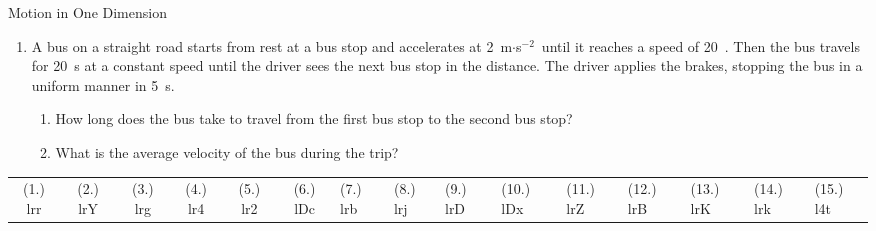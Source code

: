 \begin{eocexercises}{Motion in One Dimension}
\begin{enumerate}[noitemsep, label=\textbf{\arabic*}. ]
\item{A bus on a straight road starts from rest at a bus stop and accelerates at 2~m$\cdot$s$^{-2}$\ until it reaches a speed of 20~\ms. Then the bus travels for 20~s at a constant speed until the driver sees the next bus stop in the distance. The driver applies the brakes, stopping the bus in a uniform manner in 5~s.
\begin{enumerate}
\item How long does the bus take to travel from the first bus stop to the second bus stop?
\item What is the average velocity of the bus during the trip?
\end{enumerate}}
\end{enumerate}
\par \practiceinfo
 \par \begin{tabular}[h]{cccccc}
 (1.) lrr  &  (2.) lrY  &  (3.) lrg  &  (4.) lr4  &  (5.) lr2  &  (6.) lDc  & (7.) lrb & (8.) lrj & (9.) lrD & (10.) lDx &
(11.) lrZ & (12.) lrB & (13.) lrK & (14.) lrk & (15.) l4t
 \end{tabular}
\end{eocexercises}
